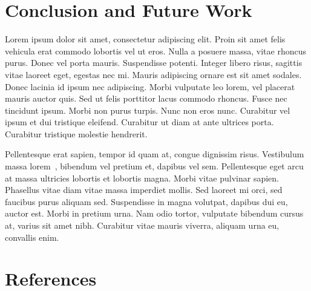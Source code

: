 \documentclass{vitmsprojectreport}
\begin{document}
\chapter{Conclusion and Future Work}

Lorem ipsum dolor sit amet, consectetur adipiscing elit. Proin sit amet felis vehicula erat commodo lobortis vel ut eros. Nulla a posuere massa, vitae rhoncus purus. Donec vel porta mauris. Suspendisse potenti. Integer libero risus, sagittis vitae laoreet eget, egestas nec mi. Mauris adipiscing ornare est sit amet sodales. Donec lacinia id ipsum nec adipiscing. Morbi vulputate leo lorem, vel placerat mauris auctor quis. Sed ut felis porttitor lacus commodo rhoncus. Fusce nec tincidunt ipsum. Morbi non purus turpis. Nunc non eros nunc. Curabitur vel ipsum et dui tristique eleifend. Curabitur ut diam at ante ultrices porta. Curabitur tristique molestie hendrerit.

Pellentesque erat sapien, tempor id quam at, congue dignissim risus. Vestibulum massa lorem~\cite{myers1979the}, bibendum vel pretium et, dapibus vel sem. Pellentesque eget arcu at massa ultricies lobortis et lobortis magna. Morbi vitae pulvinar sapien. Phasellus vitae diam vitae massa imperdiet mollis. Sed laoreet mi orci, sed faucibus purus aliquam sed. Suspendisse in magna volutpat, dapibus dui eu, auctor est. Morbi in pretium urna. Nam odio tortor, vulputate bibendum cursus at, varius sit amet nibh. Curabitur vitae mauris viverra, aliquam urna eu, convallis enim.

\chapter{References}


\end{document}
